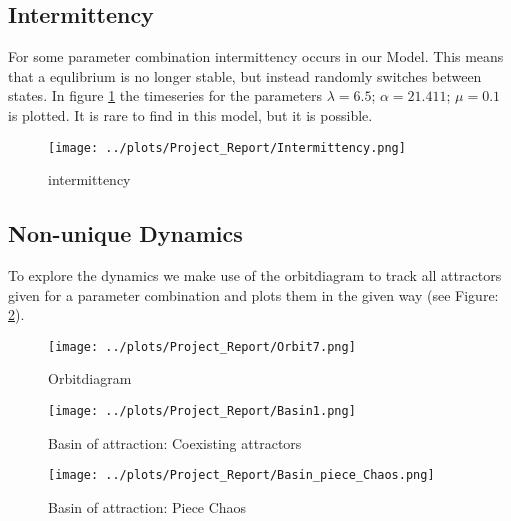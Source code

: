 \documentclass[a4paper,12pt, twoside]{article} %
\begin{document}
\subsection{Intermittency}

For some parameter combination intermittency occurs in our Model. 
This means that a equlibrium is no longer stable, but instead randomly switches between states. 
In figure \ref{fig:intermittency} the timeseries for the parameters $\lambda=6.5$; $\alpha = 21.411 $; $ \mu = 0.1$ is plotted.
It is rare to find in this model, but it is possible. 
\begin{figure}[H]
\begin{centering}
\texttt{[image: ../plots/Project\_Report/Intermittency.png]}
\caption{intermittency}\label{fig:intermittency}
\end{centering}
\end{figure}


\subsection{Non-unique Dynamics}

To explore the dynamics we make use of the orbitdiagram to track all attractors given for a parameter combination and plots them in the given way (see Figure: \ref{fig:Orbitdiagram}).


\begin{figure}[H]
  \begin{centering}
    \texttt{[image: ../plots/Project\_Report/Orbit7.png]} 
    \caption{Orbitdiagram}
    \label{fig:Orbitdiagram}
  \end{centering}
\end{figure}



\begin{figure}[H]
  \begin{centering}
    \texttt{[image: ../plots/Project\_Report/Basin1.png]}
    \caption{Basin of attraction: Coexisting attractors}
  \end{centering}
\end{figure}


\begin{figure}[H]
  \begin{centering}
    \texttt{[image: ../plots/Project\_Report/Basin\_piece\_Chaos.png]}
    \caption{Basin of attraction: Piece Chaos}
  \end{centering}
\end{figure}
\end{document}
